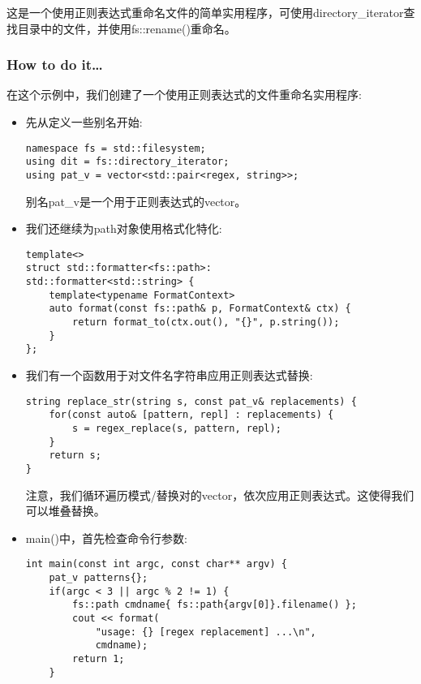 

这是一个使用正则表达式重命名文件的简单实用程序，可使用directory\_iterator查找目录中的文件，并使用fs::rename()重命名。

\subsubsection{How to do it…}

在这个示例中，我们创建了一个使用正则表达式的文件重命名实用程序:

\begin{itemize}
\item 
先从定义一些别名开始:

\begin{lstlisting}[style=styleCXX]
namespace fs = std::filesystem;
using dit = fs::directory_iterator;
using pat_v = vector<std::pair<regex, string>>;
\end{lstlisting}

别名pat\_v是一个用于正则表达式的vector。

\item 
我们还继续为path对象使用格式化特化:

\begin{lstlisting}[style=styleCXX]
template<>
struct std::formatter<fs::path>:
std::formatter<std::string> {
	template<typename FormatContext>
	auto format(const fs::path& p, FormatContext& ctx) {
		return format_to(ctx.out(), "{}", p.string());
	}
};
\end{lstlisting}

\item 
我们有一个函数用于对文件名字符串应用正则表达式替换:

\begin{lstlisting}[style=styleCXX]
string replace_str(string s, const pat_v& replacements) {
	for(const auto& [pattern, repl] : replacements) {
		s = regex_replace(s, pattern, repl);
	}
	return s;
}
\end{lstlisting}

注意，我们循环遍历模式/替换对的vector，依次应用正则表达式。这使得我们可以堆叠替换。

\item 
main()中，首先检查命令行参数:

\begin{lstlisting}[style=styleCXX]
int main(const int argc, const char** argv) {
	pat_v patterns{};
	if(argc < 3 || argc % 2 != 1) {
		fs::path cmdname{ fs::path{argv[0]}.filename() };
		cout << format(
			"usage: {} [regex replacement] ...\n",
			cmdname);
		return 1;
	}
\end{lstlisting}


\end{itemize}
